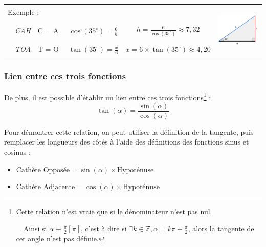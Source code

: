 \documentclass[a4paper]{article}
\begin{document}
			\begin{center}
				\renewcommand{\arraystretch}{1.75}
				\begin{tabular}{lc|c|c|cc}
					\multicolumn{5}{l}{Exemple :} & \multirow{3}{*}{\includegraphics[height=2.5cm]{Image/Triangle/Triangle_sinus_cosinus.png}} \\
					
					\phantom{Exemp} & \textit{CAH} & $\text{C = A / H}$ & $\cos(35^\circ) = \frac{6}{h}$ & $h = \frac{6}{\cos(35^\circ)} \approx 7,32 $ & \\
										& \textit{TOA} & $\text{T = O / A}$ & $\tan(35^\circ) = \frac{x}{6}$ & $x = 6 \times \tan(35^\circ) \approx 4,20 $ &\\
				\end{tabular}
			\end{center}
			

			\vfill



		\subsubsection{Lien entre ces trois fonctions} \label{lien_fct_trigo}

			De plus,
			il est possible d'établir un lien entre ces trois fonctions\footnote{Cette relation n'est vraie que si le dénominateur n'est pas nul. 
			
			~~Ainsi si $\alpha \equiv \frac{\pi}{2} [\pi] $, c'est à dire si $\exists k \in \mathbb{Z},\alpha = k\pi + \frac{\pi}{2}$, alors la tangente de cet angle n'est pas définie.} :
			{ \Large $$ \tan(\alpha) = \frac{\sin(\alpha)}{\cos(\alpha)} $$}

			\medbreak
			\medbreak

			Pour démontrer cette relation, 
			on peut utiliser la définition de la tangente, 
			puis remplacer les longueurs des côtés à l'aide 
			des définitions des fonctions sinus et cosinus :

			\medbreak

			\begin{itemize}
				\item [ ] $\text{Cathète Opposée}   = \sin(\alpha) \times \text{Hypoténuse}$
				\item [ ] $\text{Cathète Adjacente} = \cos(\alpha) \times \text{Hypoténuse}$
			\end{itemize}
\end{document}
